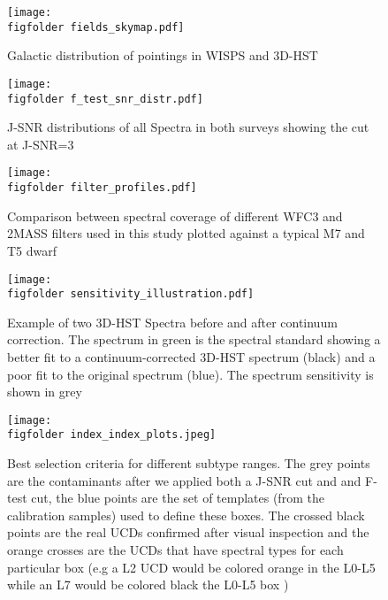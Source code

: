 \documentclass[manuscript]{aastex63}
\begin{document}
\begin{figure}
    \centering
    \texttt{[image: \\figfolder fields\_skymap.pdf]}
    \caption{Galactic distribution of pointings in WISPS and 3D-HST}
    \label{fig:skymap}
\end{figure}

\begin{figure}
    \centering
    \texttt{[image: \\figfolder f\_test\_snr\_distr.pdf]}
    \caption{J-SNR distributions of all Spectra in both surveys showing the cut at J-SNR=3}
    \label{fig:ftestdistr}
\end{figure}



\begin{figure}
    \centering
    \texttt{[image: \\figfolder filter\_profiles.pdf]}
    \caption{Comparison between spectral coverage of different WFC3 and 2MASS filters used in this study plotted against a typical M7 and T5 dwarf}
    \label{fig:filterprofiles}
\end{figure}



\begin{figure}
\centering
\texttt{[image: \\figfolder sensitivity\_illustration.pdf]}
\caption{ Example of two 3D-HST Spectra before and after continuum correction. The spectrum in green is the spectral standard showing a better fit to a continuum-corrected 3D-HST spectrum (black) and a poor fit to the original spectrum (blue). The spectrum sensitivity is shown in grey}
\label{fig:sensitivity}
\end{figure}

\begin{sidewaysfigure}
    \centering
    \texttt{[image: \\figfolder index\_index\_plots.jpeg]}
    \caption{Best selection criteria for different subtype ranges. The grey points are the contaminants after we applied both a J-SNR cut and and F-test cut, the blue points are the set of templates (from the calibration samples) used to define these boxes. The crossed black points are the real UCDs confirmed after visual inspection and the orange crosses are the UCDs that have spectral types for each particular box (e.g a L2 UCD would be colored orange in the L0-L5 while an L7 would be colored black the L0-L5 box )}
    \label{fig:indexplots}
\end{sidewaysfigure}
\end{document}
